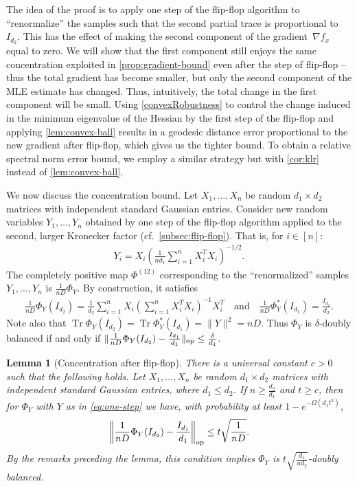 \documentclass[aos]{imsart}
\newtheorem{lemma}[theorem]{Lemma}
\theoremstyle{definition}
\numberwithin{equation}{section}
\DeclareMathOperator{\op}{op}
\DeclareMathOperator{\tr}{Tr}
\DeclarePairedDelimiter{\norm}{\lVert}{\rVert}
\newcommand{\samp}{x}
\begin{document}
The idea of the proof is to apply one step of the flip-flop algorithm to ``renormalize'' the samples such that the second partial trace is proportional to $I_{d_2}$.
This has the effect of making the second component of the gradient~$\nabla f_\samp$ equal to zero.
We will show that the first component still enjoys the same concentration exploited in \cref{prop:gradient-bound} even after the step of flip-flop -- thus the total gradient has become smaller, but only the second component of the MLE estimate has changed.
Thus, intuitively, the total change in the first component will be small.
Using \cref{convexRobustness} to control the change induced in the minimum eigenvalue of the Hessian by the first step of the flip-flop and applying \cref{lem:convex-ball} results in a geodesic distance error proportional to the new gradient after flip-flop, which gives us the tighter bound.
To obtain a relative spectral norm error bound, we employ a similar strategy but with \cref{cor:klr} instead of \cref{lem:convex-ball}.

We now discuss the concentration bound.
Let $X_1,\dots,X_n$ be random $d_1 \times d_2$ matrices with independent standard Gaussian entries.
Consider new random variables $Y_1,\dots,Y_n$ obtained by one step of the flip-flop algorithm applied to the second, larger Kronecker factor (cf.\ \cref{subsec:flip-flop}).
That is, for $i\in[n]$:
\begin{align}\label{eq:one-step}
  Y_i = X_i \left( \frac1{nd_1} \sum_{i=1}^n X_i^T X_i \right)^{-1/2}.
\end{align}
The completely positive map $\Phi^{(12)}$ corresponding to the ``renormalized'' samples $Y_1,\dots,Y_n$ is $\frac1{nD} \Phi_Y$.
By construction, it satisfies
\begin{align*}
  \frac1{n D} \Phi_Y(I_{d_2}) = \frac1{d_2} \sum_{i=1}^{n} X_i \left( \sum_{i=1}^n X_i^T X_i \right)^{-1} X_i^T
\quad\text{and}\quad
  \frac1{n D} \Phi^*_Y(I_{d_1}) = \frac{I_{d_2}}{d_2}.
\end{align*}
Note also that $\tr \Phi_Y(I_{d_2}) = \tr \Phi_Y^*(I_{d_1}) = \|Y\|^2 = nD$. Thus $\Phi_Y$ is $\delta$-doubly balanced if and only if $\|\frac{1}{nD} \Phi_Y(I_{d_2}) - \smash{\frac{I_{d_1}}{d_1}}\|_{\op} \leq \frac{\delta}{d_1}$.

\begin{lemma}[Concentration after flip-flop]\label{lem:flipflop-concentration}
There is a universal constant $c>0$ such that the following holds.
Let $X_1,\dots,X_n$ be random $d_1 \times d_2$ matrices with independent standard Gaussian entries, where $d_1 \leq d_2$.
If $n \geq \frac{d_2}{d_1}$ and $t\geq c$, then for $\Phi_Y$ with $Y$ as in \cref{eq:one-step} we have, with probability at least $1 - e^{- \Omega( d_1 t^2)}$,
\begin{align*}
  \norm*{\frac1{n D} \Phi_Y(I_{d_2}) - \frac{I_{d_1}}{d_1}}_{\op} \leq t \sqrt{\frac1{nD}}.
\end{align*}
By the remarks preceding the lemma, this condition implies $\Phi_Y$ is $t \sqrt{\frac{d_1}{nd_2}}$-doubly balanced.
\end{lemma}
\end{document}
